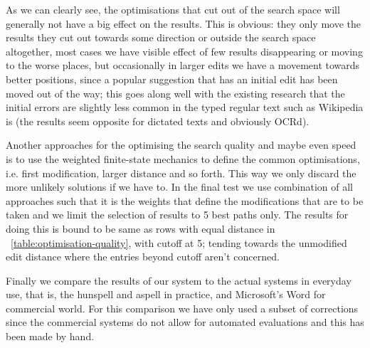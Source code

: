 \documentclass[a4paper,12pt]{article}
\begin{document}
As we can clearly see, the optimisations that cut out of the search space will
generally not have a big effect on the results. This is obvious: they only move
the results they cut out towards some direction or outside the search space
altogether, most cases we have visible effect of few results disappearing or
moving to the worse places, but occasionally in larger edits we have a movement
towards better positions, since a popular suggestion that has an initial edit
has been moved out of the way; this goes along well with the existing research
that the initial errors are slightly less common in the typed regular text such
as Wikipedia is (the results seem opposite for dictated texts and obviously
OCRd).

Another approaches for the optimising the search quality and maybe even speed
is to use the weighted finite-state mechanics to define the common
optimisations, i.e. first modification, larger distance and so forth. This way
we only discard the more unlikely solutions if we have to. In the final test we
use combination of all approaches such that it is the weights that define the
modifications that are to be taken and we limit the selection of results to 5
best paths only. The results for doing this is bound to be same as rows with
equal distance in ~\ref{table:optimisation-quality}, with cutoff at 5; tending
towards the unmodified edit distance where the entries beyond cutoff aren't
concerned.

%

Finally we compare the results of our system to the actual systems in everyday
use, that is, the hunspell and aspell in practice, and Microsoft's Word for
commercial world. For this comparison we have only used a subset of corrections
since the commercial systems do not allow for automated evaluations and
this has been made by hand. 
\end{document}
